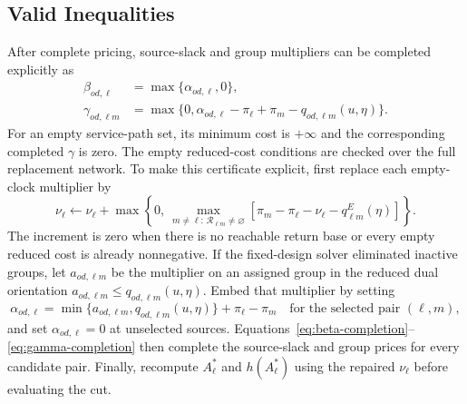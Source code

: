 \documentclass[final,3p,authoryear]{elsarticle}
\begin{document}
\subsection{Valid Inequalities}
\label{sec:valid_inequalities_integrated}


After complete pricing, source-slack and group multipliers can be completed explicitly as
\begin{align}
 \beta_{od,\ell}&=\max\{\alpha_{od,\ell},0\},\label{eq:beta-completion}\\
 \gamma_{od,\ell m}&=
 \max\{0,\alpha_{od,\ell}-\pi_\ell+\pi_m-q_{od,\ell m}(u,\eta)\}.
 \label{eq:gamma-completion}
\end{align}
For an empty service-path set, its minimum cost is $+\infty$ and the corresponding completed $\gamma$ is zero.
The empty reduced-cost conditions are checked over the full replacement network.
To make this certificate explicit, first replace each empty-clock multiplier by
\begin{equation}
 \nu_\ell\leftarrow\nu_\ell+
 \max\left\{0,\ \max_{m\ne\ell:\,\mathcal R_{\ell m}\ne\varnothing}
 [\pi_m-\pi_\ell-\nu_\ell-q_{\ell m}^E(\eta)]\right\}.
 \label{eq:empty-dual-repair}
\end{equation}
The increment is zero when there is no reachable return base or every empty reduced cost is already nonnegative.
If the fixed-design solver eliminated inactive groups, let $a_{od,\ell m}$ be the multiplier on an assigned group in the reduced dual orientation $a_{od,\ell m}\le q_{od,\ell m}(u,\eta)$.
Embed that multiplier by setting
\begin{equation}
 \alpha_{od,\ell}=
 \min\{a_{od,\ell m},q_{od,\ell m}(u,\eta)\}+\pi_\ell-\pi_m
 \quad\text{for the selected pair $(\ell,m)$},
 \label{eq:alpha-embedding}
\end{equation}
and set $\alpha_{od,\ell}=0$ at unselected sources.
Equations~\eqref{eq:beta-completion}--\eqref{eq:gamma-completion} then complete the source-slack and group prices for every candidate pair.
Finally, recompute $A_\ell^*$ and $h(A_\ell^*)$ using the repaired $\nu_\ell$ before evaluating the cut.
\end{document}
